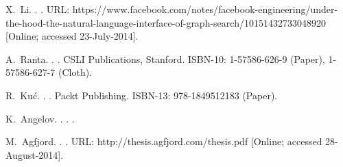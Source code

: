 
% 

\begin{thebibliography}{}

X.~Li.
.
.
\newblock URL: https://www.facebook.com/notes/facebook-engineering/under-the-hood-the-natural-language-interface-of-graph-search/10151432733048920 [Online; accessed 23-July-2014].

A.~Ranta.
.
.
\newblock CSLI Publications, Stanford.
\newblock ISBN-10: 1-57586-626-9 (Paper), 1-57586-627-7 (Cloth).

R.~Ku{\'{c}}.
.
.
\newblock Packt Publishing.
\newblock ISBN-13: 978-1849512183 (Paper).

K.~Angelov.
.
.
.

M.~Agfjord.
.
.
\newblock URL: http://thesis.agfjord.com/thesis.pdf [Online; accessed 28-August-2014].

\end{thebibliography}